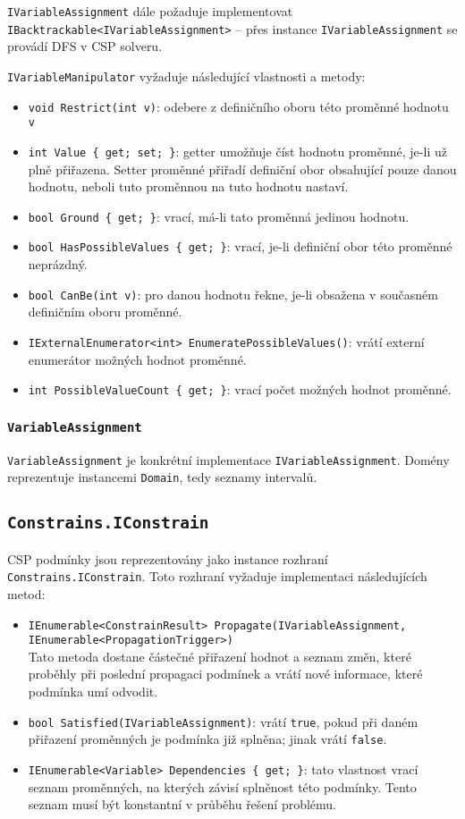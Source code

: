 \documentclass[a4paper]{article}
\begin{document}
\texttt{IVariableAssignment} dále požaduje implementovat
\texttt{IBacktrackable<IVariableAssignment>} -- přes instance
\texttt{IVariableAssignment} se provádí DFS v CSP solveru.

\texttt{IVariableManipulator} vyžaduje následující vlastnosti a metody:
\begin{itemize}
\item
	\texttt{void Restrict(int v)}: odebere z definičního oboru této proměnné
	hodnotu \texttt{v}
\item
	\texttt{int Value \{ get; set; \}}: getter umožňuje číst hodnotu
	proměnné, je-li už plně přiřazena. Setter proměnné přiřadí definiční
	obor obsahující pouze danou hodnotu, neboli tuto proměnnou na tuto
	hodnotu nastaví.
\item
	\texttt{bool Ground \{ get; \}}: vrací, má-li tato proměnná jedinou
	hodnotu.
\item
	\texttt{bool HasPossibleValues \{ get; \}}: vrací, je-li definiční obor
	této proměnné neprázdný.
\item
	\texttt{bool CanBe(int v)}: pro danou hodnotu řekne, je-li obsažena v
	současném definičním oboru proměnné.
\item
	\texttt{IExternalEnumerator<int> EnumeratePossibleValues()}: vrátí
	externí enumerátor možných hodnot proměnné.
\item
	\texttt{int PossibleValueCount \{ get; \}}: vrací počet možných hodnot
	proměnné.
\end{itemize}

\subsubsection{\texttt{VariableAssignment}}
\texttt{VariableAssignment} je konkrétní implementace \texttt{IVariableAssignment}.
Domény reprezentuje instancemi \texttt{Domain}, tedy seznamy intervalů.

\subsection{\texttt{Constrains.IConstrain}}
CSP podmínky jsou reprezentovány jako instance rozhraní
\texttt{Constrains.IConstrain}. Toto rozhraní vyžaduje implementaci
následujících metod:
\begin{itemize}
\item
	\texttt{IEnumerable<ConstrainResult> Propagate(IVariableAssignment,
	IEnumerable<PropagationTrigger>)} \\
	Tato metoda dostane částečné přiřazení hodnot a seznam změn, které
	proběhly při poslední propagaci podmínek a vrátí nové informace, které
	podmínka umí odvodit.
\item
	\texttt{bool Satisfied(IVariableAssignment)}: vrátí \texttt{true}, pokud
	při daném přiřazení proměnných je podmínka již splněna; jinak vrátí
	\texttt{false}.
\item
	\texttt{IEnumerable<Variable> Dependencies \{ get; \}}: tato vlastnost
	vrací seznam proměnných, na kterých závisí splněnost této podmínky.
	Tento seznam musí být konstantní v průběhu řešení problému.
\end{itemize}
\end{document}
